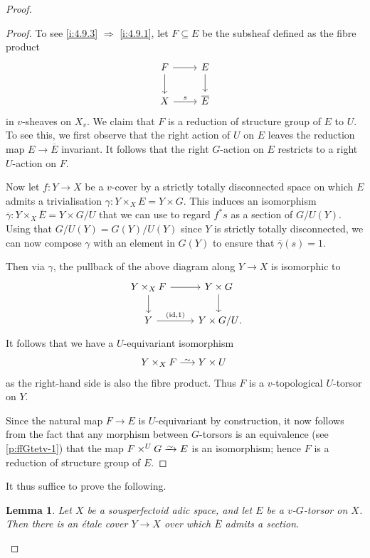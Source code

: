 \documentclass[11pt]{amsart}
\numberwithin{equation}{section}
\newtheorem{Lemma}[thm]{Lemma}
\theoremstyle{definition}
\theoremstyle{remark}
\newcommand{\lra}{\longrightarrow}
\newcommand*{\lowsim}{\vbox to 0pt{\vss\hbox{$\scriptstyle\sim$}\vskip-2pt}}
\newcommand*{\isomarrow}{\xrightarrow{\lowsim}}
\newcommand*{\longisomarrow}{\stackrel{\lowsim}{\lra}}
\newcommand{\id}{{\operatorname{id}}}
\begin{document}
\begin{proof}
\begin{proof}
			
			 To see \eqref{i:4.9.3} $\Rightarrow$ \eqref{i:4.9.1}, let $F\subseteq E$ be the subsheaf defined as the fibre product 
			\[\begin{tikzcd}
				F \arrow[d] \arrow[r] & E \arrow[d] \\
				X \arrow[r,"s"] & \overline{E}
			\end{tikzcd}\]
			in $v$-sheaves on $X_v$. We claim that $F$	is a reduction of structure group of $E$ to $U$. To see this, we first observe that the right action of $U$ on $E$ leaves the reduction map $E\to \overline{E}$ invariant. It follows that the right $G$-action on $E$ restricts to a right $U$-action on $F$. 
			
			Now let  $f\colon Y\to X$ be a $v$-cover by a strictly totally disconnected space on which $E$ admits a trivialisation $\gamma\colon Y\times_XE=Y\times G$. This induces an isomorphism $\overline{\gamma}\colon Y\times_X\overline{E}=Y\times G/U$ that we can use to regard $f^\ast s$ as a section of $G/U(Y)$. Using that $G/U(Y)=G(Y)/U(Y)$ since $Y$ is strictly totally disconnected, we can now compose $\gamma$ with an element in $G(Y)$ to ensure that $\overline{\gamma}(s)=1$.
			
			Then via $\gamma$, the pullback of the above diagram along $Y\to X$ is isomorphic to
			\[\begin{tikzcd}
				Y\times_XF \arrow[d] \arrow[r] & Y\times G \arrow[d] \\
				Y \arrow[r,"{(\id,1)}"] &  Y\times G/U\rlap{.}
			\end{tikzcd} \]
			It follows that we have a $U$-equivariant isomorphism
			\[ Y\times_XF\longisomarrow Y\times U\,\]
			as the right-hand side is also the fibre product. Thus $F$ is a $v$-topological $U$-torsor on $Y$.
			
			Since the natural map $F\to E$ is $U$-equivariant by construction, it now follows from the fact that any morphism between $G$-torsors is an equivalence (see \eqref{p:ffGtetv-1}) that the map $F\times^UG\isomarrow E$ is an isomorphism; hence $F$ is a reduction of structure group of $E$.
	\end{proof}
        
		It thus suffice to prove the following. 

	        \begin{Lemma}\label{l:section-over-et-cover}
			Let $X$ be a sousperfectoid adic space, and let $E$ be a $v$-$G$-torsor on $X$. Then
			there is an \'etale cover $Y\to X$ over which $\overline{E}$ admits a section.
		\end{Lemma}


\end{proof}
\end{document}
